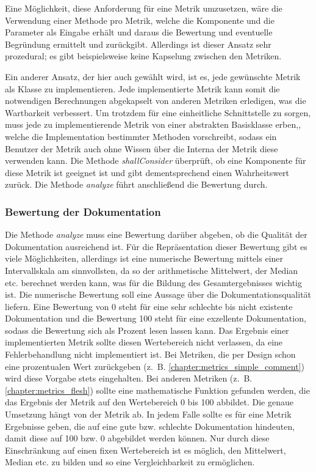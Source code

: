 Eine Möglichkeit, diese Anforderung für eine Metrik umzusetzen, wäre die Verwendung einer Methode pro Metrik, welche die Komponente und die Parameter als Eingabe erhält und daraus die Bewertung und eventuelle Begründung ermittelt und zurückgibt. Allerdings ist dieser Ansatz sehr prozedural; es gibt beispielsweise keine Kapselung zwischen den Metriken.  

Ein anderer Ansatz, der hier auch gewählt wird, ist es, jede gewünschte Metrik als Klasse zu implementieren. Jede implementierte Metrik kann somit die notwendigen Berechnungen abgekapselt von anderen Metriken erledigen, was die Wartbarkeit verbessert. Um trotzdem für eine einheitliche Schnittstelle zu sorgen, muss jede zu implementierende Metrik von einer abstrakten Basisklasse erben,, welche die Implementation bestimmter Methoden vorschreibt, sodass ein Benutzer der Metrik auch ohne Wissen über die Interna der Metrik diese verwenden kann. Die Methode \textit{shallConsider} überprüft, ob eine Komponente für diese Metrik ist geeignet ist und gibt dementsprechend einen Wahrheitswert zurück. Die Methode \textit{analyze} führt anschließend die Bewertung durch.

\subsubsection{Bewertung der Dokumentation}
Die Methode \textit{analyze} muss eine Bewertung darüber abgeben, ob die Qualität der Dokumentation ausreichend ist. Für die Repräsentation dieser Bewertung gibt es viele Möglichkeiten, allerdings ist eine numerische Bewertung mittels einer Intervallskala am sinnvollsten, da so der arithmetische Mittelwert, der Median etc. berechnet werden kann, was für die Bildung des Gesamtergebnisses wichtig ist.
Die numerische Bewertung soll eine Aussage über die Dokumentationsqualität liefern. Eine Bewertung von 0 steht für eine sehr schlechte bis nicht existente Dokumentation und die Bewertung 100 steht für eine exzellente Dokumentation, sodass die Bewertung sich als Prozent lesen lassen kann. Das Ergebnis einer implementierten Metrik sollte diesen Wertebereich nicht verlassen, da eine Fehlerbehandlung nicht implementiert ist. Bei Metriken, die per Design schon eine prozentualen Wert zurückgeben (z.~B. \ref{chapter:metrics_simple_comment}) wird diese Vorgabe stets eingehalten. Bei anderen Metriken (z.~B. \ref{chapter:metrics_flesh}) sollte eine mathematische Funktion gefunden werden, die das Ergebnis der Metrik auf den Wertebereich 0 bis 100 abbildet. Die genaue Umsetzung hängt von der Metrik ab. In jedem Falle sollte es für eine Metrik Ergebnisse geben, die auf eine gute bzw. schlechte Dokumentation hindeuten, damit diese auf 100 bzw. 0 abgebildet werden können. Nur durch diese Einschränkung auf einen fixen Wertebereich ist es möglich, den Mittelwert, Median etc. zu bilden und so eine Vergleichbarkeit zu ermöglichen. 


